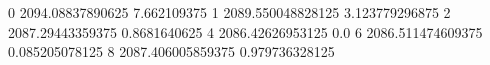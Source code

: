 0 2094.08837890625 7.662109375
1 2089.550048828125 3.123779296875
2 2087.29443359375 0.8681640625
4 2086.42626953125 0.0
6 2086.511474609375 0.085205078125
8 2087.406005859375 0.979736328125
